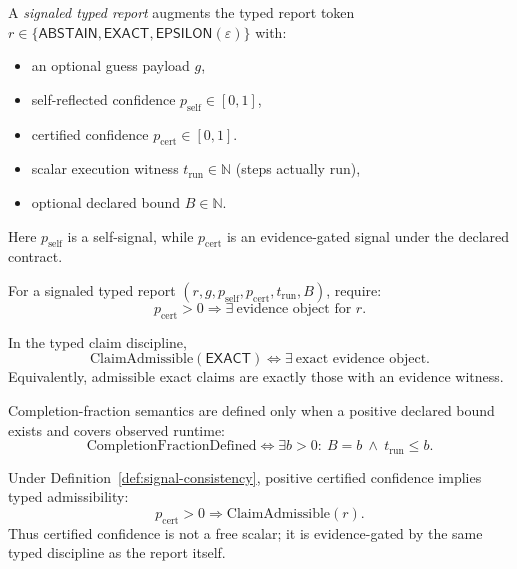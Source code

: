 \begin{definition}\label{def:signaled-typed-report}
A \emph{signaled typed report} augments the typed report token
$r\in\{\mathsf{ABSTAIN},\mathsf{EXACT},\mathsf{EPSILON}(\varepsilon)\}$ with:
\begin{itemize}
\item an optional guess payload $g$,
\item self-reflected confidence $p_{\mathrm{self}}\in[0,1]$,
\item certified confidence $p_{\mathrm{cert}}\in[0,1]$.
\item scalar execution witness $t_{\mathrm{run}}\in\mathbb{N}$ (steps actually run),
\item optional declared bound $B\in\mathbb{N}$.
\end{itemize}
Here $p_{\mathrm{self}}$ is a self-signal, while $p_{\mathrm{cert}}$ is an evidence-gated signal under the declared contract.
\end{definition}

\begin{definition}\label{def:signal-consistency}
For a signaled typed report $(r,g,p_{\mathrm{self}},p_{\mathrm{cert}},t_{\mathrm{run}},B)$, require:
\[
p_{\mathrm{cert}} > 0 \Rightarrow \exists\ \text{evidence object for }r.
\]
\end{definition}

\begin{proposition}\label{prop:exact-requires-evidence}
In the typed claim discipline,
\[
\text{ClaimAdmissible}(\mathsf{EXACT})
\iff
\exists\ \text{exact evidence object}.
\]
Equivalently, admissible exact claims are exactly those with an evidence witness.
\end{proposition}

\begin{definition}\label{def:completion-fraction}
Completion-fraction semantics are defined only when a positive declared bound exists and covers observed runtime:
\[
\mathrm{CompletionFractionDefined}
\iff
\exists b>0:\ B=b\ \wedge\ t_{\mathrm{run}}\le b.
\]
\end{definition}

\begin{proposition}\label{prop:certified-confidence-gate}
Under Definition~\ref{def:signal-consistency}, positive certified confidence implies typed admissibility:
\[
p_{\mathrm{cert}} > 0 \Rightarrow \text{ClaimAdmissible}(r).
\]
Thus certified confidence is not a free scalar; it is evidence-gated by the same typed discipline as the report itself.
\end{proposition}

